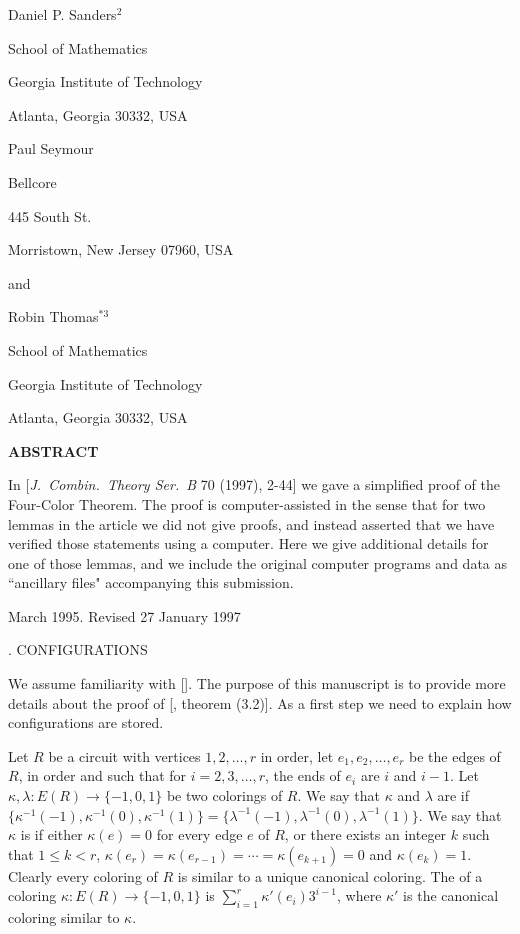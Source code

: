 \centerline{Daniel P. Sanders$^{2}$}
\centerline{School of Mathematics}
\centerline{Georgia Institute of Technology}
\centerline{Atlanta, Georgia  30332, USA}
\bigskip

\centerline{Paul Seymour}
\centerline{Bellcore}
\centerline{445 South St.}
\centerline{Morristown, New Jersey  07960, USA}
\bigskip

\centerline{and}
\bigskip

\centerline{Robin Thomas$^{*3}$}
\centerline{School of Mathematics}
\centerline{Georgia Institute of Technology}
\centerline{Atlanta, Georgia  30332, USA}
\bigskip\bigskip\bigskip

\centerline{\bf ABSTRACT}
\bigskip

In [{\it J.~Combin.\ Theory Ser.\ B} 70 (1997), 2-44] we gave a simplified proof
of the Four-Color Theorem. The proof is computer-assisted in the sense
that for two lemmas in the article we did not give proofs, and instead
asserted that we have verified those statements using a computer. Here
we give additional details for one of those lemmas, and we include the
original computer programs and data as ``ancillary files" accompanying this
submission. 


\vfill
{} March 1995.
 Revised 27 January 1997
\vfil
\eject

\footline{\hss\tenrm\folio\hss}
\baselineskip 22pt


. CONFIGURATIONS

We assume familiarity with [].
The purpose of this manuscript
is to provide more details about the proof of [, theorem (3.2)].
As a first step we need to explain how configurations are stored.

Let $R$ be a circuit with vertices $1,2,\ldots,r$ in order, let
$e_1,e_2,\ldots,e_r$ be the edges of $R$, in order and such that
for $i=2,3,\ldots,r$, the ends of $e_i$ are $i$ and $i-1$. Let
$\kappa,\lambda:E(R)\to \{-1,0,1\}$ be two colorings of $R$. We
say that $\kappa$ and $\lambda$ are
 if $\{\kappa^{-1}(-1),\kappa^{-1}(0),\kappa^{-1}(1)\}=
\{\lambda^{-1}(-1),\lambda^{-1}(0),\lambda^{-1}(1)\}$. We say
that $\kappa$ is  if either $\kappa(e)=0$ for every
edge $e$ of $R$, or there exists an integer $k$ such that $1\le k<r$,
$\kappa(e_r)=\kappa(e_{r-1})=\cdots=\kappa(e_{k+1})=0$ and
$\kappa(e_k)=1$. Clearly every coloring of $R$ is similar to
a unique canonical coloring.
The  of a coloring $\kappa:E(R)\to \{-1,0,1\}$ is
$\sum_{i=1}^r\kappa'(e_i)3^{i-1}$, where $\kappa'$ is the canonical
coloring similar to $\kappa$. 

